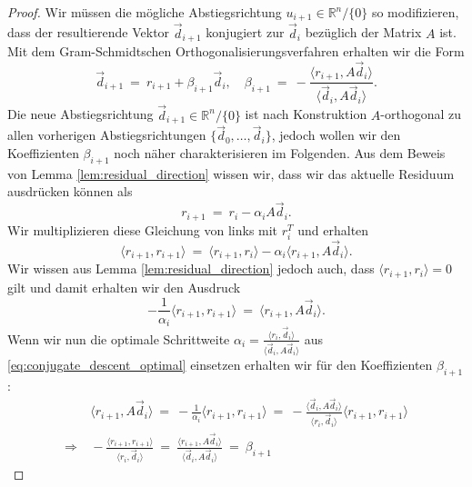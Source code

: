 \begin{proof}
Wir müssen die mögliche Abstiegsrichtung $u_{i+1} \in \mathbb{R}^n / \lbrace 0 \rbrace$ so modifizieren, dass der resultierende Vektor $\vec{d}_{i+1}$ konjugiert zur $\vec{d}_i$ bezüglich der Matrix $A$ ist.
Mit dem Gram-Schmidtschen Orthogonalisierungsverfahren erhalten wir die Form
\begin{equation*}
\vec{d}_{i+1} \ = \ r_{i+1} + \beta_{i+1} \vec{d}_i, \quad \beta_{i+1} \ = \ - \frac{\langle r_{i+1}, A\vec{d}_i\rangle}{\langle \vec{d}_i, A\vec{d}_i \rangle}.
\end{equation*}
Die neue Abstiegsrichtung $\vec{d}_{i+1} \in \mathbb{R}^n / \lbrace 0 \rbrace$ ist nach Konstruktion $A$-orthogonal zu allen vorherigen Abstiegsrichtungen $\lbrace \vec{d}_0, \ldots, \vec{d}_i \rbrace$, jedoch wollen wir den Koeffizienten $\beta_{i+1}$ noch näher charakterisieren im Folgenden.
Aus dem Beweis von Lemma \ref{lem:residual_direction} wissen wir, dass wir das aktuelle Residuum ausdrücken können als
\begin{equation*}
r_{i+1} \ = \ r_i - \alpha_iA\vec{d}_i.
\end{equation*}
Wir multiplizieren diese Gleichung von links mit $r_i^T$ und erhalten
\begin{equation*}
\langle r_{i+1}, r_{i+1} \rangle \ = \ \langle r_{i+
1}, r_i \rangle - \alpha_i\langle r_{i+1}, A\vec{d}_i \rangle.
\end{equation*}
Wir wissen aus Lemma \ref{lem:residual_direction} jedoch auch, dass $\langle r_{i+1}, r_i \rangle = 0$ gilt und damit erhalten wir den Ausdruck
\begin{equation*}
-\frac{1}{\alpha_i}\langle r_{i+1}, r_{i+1} \rangle \ = \ \langle r_{i+1}, A\vec{d}_i \rangle.
\end{equation*}
Wenn wir nun die optimale Schrittweite $\alpha_i = \frac{\langle r_i, \vec{d}_i \rangle}{\langle \vec{d}_i, A\vec{d}_i \rangle}$ aus \eqref{eq:conjugate_descent_optimal} einsetzen erhalten wir für den Koeffizienten $\beta_{i+1}$:
\begin{equation*}
\begin{split}
& \ \langle r_{i+1}, A\vec{d}_i \rangle  \ = \ -\frac{1}{\alpha_i}\langle r_{i+1}, r_{i+1} \rangle \ = \ -\frac{\langle \vec{d}_i, A\vec{d}_i \rangle}{\langle r_i, \vec{d}_i \rangle} \langle r_{i+1}, r_{i+1} \rangle \\
\Rightarrow & \ -\frac{\langle r_{i+1}, r_{i+1}\rangle }{\langle r_i, \vec{d}_i \rangle} \ = \ \frac{\langle r_{i+1}, A\vec{d}_i \rangle}{\langle \vec{d}_i, A\vec{d}_i \rangle} \ = \ \beta_{i+1}

\end{split}
\end{equation*}
\end{proof}
